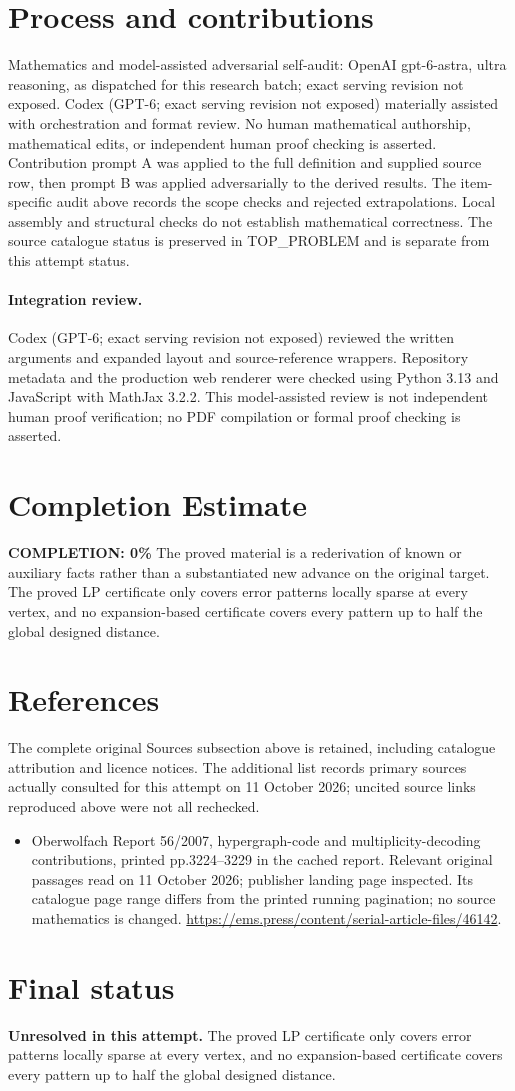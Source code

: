 \documentclass[11pt]{article}
\begin{document}
\section{Process and contributions}
Mathematics and model-assisted adversarial self-audit: OpenAI gpt-6-astra, ultra reasoning, as dispatched for this research batch; exact serving revision not exposed. Codex (GPT-6; exact serving revision not exposed) materially assisted with orchestration and format review. No human mathematical authorship, mathematical edits, or independent human proof checking is asserted.
Contribution prompt A was applied to the full definition and supplied source row, then prompt B was applied adversarially to the derived results. The item-specific audit above records the scope checks and rejected extrapolations. Local assembly and structural checks do not establish mathematical correctness. The source catalogue status is preserved in TOP\_PROBLEM and is separate from this attempt status.
\paragraph{Integration review.} Codex (GPT-6; exact serving revision not exposed) reviewed the written arguments and expanded layout and source-reference wrappers. Repository metadata and the production web renderer were checked using Python 3.13 and JavaScript with MathJax 3.2.2. This model-assisted review is not independent human proof verification; no PDF compilation or formal proof checking is asserted.

\section{Completion Estimate}
\noindent\textbf{COMPLETION: 0\%}
The proved material is a rederivation of known or auxiliary facts rather than a substantiated new advance on the original target. The proved LP certificate only covers error patterns locally sparse at every vertex, and no expansion-based certificate covers every pattern up to half the global designed distance.
\section{References}
The complete original Sources subsection above is retained, including catalogue attribution and licence notices. The additional list records primary sources actually consulted for this attempt on 11 October 2026; uncited source links reproduced above were not all rechecked.
\begin{itemize}
\item Oberwolfach Report 56/2007, hypergraph-code and multiplicity-decoding contributions, printed pp.3224--3229 in the cached report. Relevant original passages read on 11 October 2026; publisher landing page inspected. Its catalogue page range differs from the printed running pagination; no source mathematics is changed. \url{https://ems.press/content/serial-article-files/46142}.
\end{itemize}
\section{Final status}
\textbf{Unresolved in this attempt.} The proved LP certificate only covers error patterns locally sparse at every vertex, and no expansion-based certificate covers every pattern up to half the global designed distance.
\end{document}
